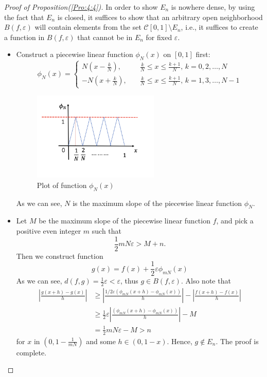 \begin{proof}[Proof of Proposition(\ref{Pro:4:4})]
In order to show $E_n$ is nowhere dense, by using the fact that $E_n$ is closed, it suffices to show that an arbitrary open neighborhood $B(f,\varepsilon)$ will contain elements from the set $\mathcal{C}[0,1]\setminus E_n$, i.e., it suffices to create a function in $B(f,\varepsilon)$ that cannot be in $E_n$ for fixed $\varepsilon$.
\begin{itemize}
\item
Construct a piecewise linear function $\phi_N(x)$ on $[0,1]$ first:
\[
\phi_N(x)=\left\{
\begin{aligned}
N(x-\frac{k}{N}),&\quad \frac{k}{N}\le x\le\frac{k+1}{N}\mbox{, $k=0,2,\dots,N$}\\
-N(x+\frac{k}{N}),&\quad\frac{k}{N}\le x\le\frac{k+1}{N}\mbox{, $k=1,3,\dots,N-1$}
\end{aligned}
\right.
\]
\begin{figure}[H]
\centering
\includegraphics[width=6cm]{week4/4_3.png}
\caption{Plot of function $\phi_N(x)$}
\end{figure}
As we can see, $N$ is the maximum slope of the piecewise linear function $\phi_N$.
\item
Let $M$ be the maximum slope of the piecewise linear function $f$, and pick a positive even integer $m$ such that
\[
\frac{1}{2}mN\varepsilon>M+n.
\]
Then we construct function
\[
g(x) = f(x)+\frac{1}{2}\varepsilon\phi_{mN}(x)
\]
As we can see, $d(f,g)=\frac{1}{2}\varepsilon<\varepsilon$, thus $g\in B(f,\varepsilon).$ Also note that
\begin{align*}
\left|\frac{g(x+h)-g(x)}{h}\right|
&\ge
\left|\frac{1/2\varepsilon(\phi_{mN}(x+h) - \phi_{mN}(x))}{h}\right|
-
\left|\frac{f(x+h)-f(x)}{h}\right|\\
&\ge
\frac{1}{2}\varepsilon\left|\frac{(\phi_{mN}(x+h) - \phi_{mN}(x))}{h}\right|-M\\
&=\frac{1}{2}mN\varepsilon - M>n
\end{align*}
for $x$ in $(0,1-\frac{1}{mN})$ and some $h\in(0,1-x)$. Hence, $g\notin E_n$. The proof is complete.
\end{itemize}
\end{proof}

